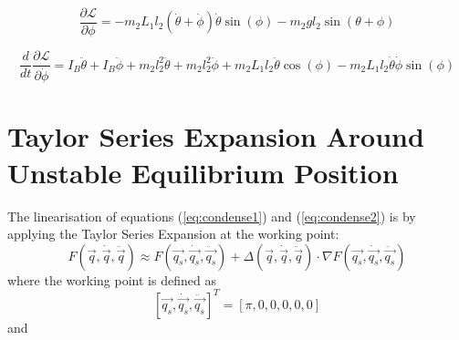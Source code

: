 \begin{equation}
\frac{\partial\mathcal{L}}{\partial\phi} = -m_{2}L_{1}l_{2}(\dot{\theta}+\dot{\phi})\dot{\theta}\sin(\phi)-m_{2}gl_{2}\sin(\theta+\phi)
\end{equation}


\begin{equation}
\frac{d}{dt}\frac{\partial\mathcal{L}}{\partial\dot{\phi}}=I_{B}\ddot{\theta}+I_{B}\ddot{\phi}+m_{2}l_{2}^2\ddot{\theta}+m_{2}l_{2}^2\ddot{\phi}+m_{2}L_{1}l_{2}\ddot{\theta}\cos(\phi)-m_{2}L_{1}l_{2}\dot{\theta}\dot{\phi}\sin(\phi)
\end{equation}

\section{Taylor Series Expansion Around Unstable Equilibrium Position}
\label{sec:linerisation}
The linearisation of equations (\ref{eq:condense1}) and (\ref{eq:condense2}) is by applying the Taylor Series Expansion at the working point:
\begin{equation}
	F(  \vec{q}, \dot{ \vec{q} }, \ddot{ \vec{q} } )  \approx  F(\vec{q_{s}},\dot{\vec{q_{s}}},\ddot{\vec{q_{s}}}) + \Delta( \vec{q}, \dot{ \vec{q} }, \ddot{ \vec{q} })\cdot \nabla F(\vec{q_{s}},\dot{\vec{q_{s}}},\ddot{\vec{q_{s}}})
\end{equation}
where the working point is defined as 
\begin{equation}
\label{eq:workingpoint}
[\vec{q_{s}},\dot{\vec{q_{s}}},\ddot{\vec{q_{s}}}]^{T}=[\pi,0,0,0,0,0]
\end{equation}
and 

